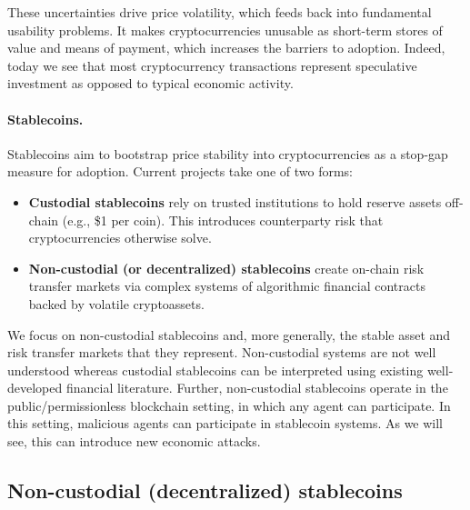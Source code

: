 These uncertainties drive price volatility, which feeds back into fundamental usability problems. It makes cryptocurrencies unusable as short-term stores of value and means of payment, which increases the barriers to adoption. Indeed, today we see that most cryptocurrency transactions represent speculative investment as opposed to typical economic activity.


\paragraph{Stablecoins.}
Stablecoins aim to bootstrap price stability into cryptocurrencies as a stop-gap measure for adoption. Current projects take one of two forms:
\begin{itemize}
	\item \textbf{Custodial stablecoins} rely on trusted institutions to hold reserve assets off-chain (e.g., \$1 per coin). This introduces counterparty risk that cryptocurrencies otherwise solve.
	\item \textbf{Non-custodial (or decentralized) stablecoins} create on-chain risk transfer markets via complex systems of algorithmic financial contracts backed by volatile cryptoassets.
\end{itemize}
We focus on non-custodial stablecoins and, more generally, the stable asset and risk transfer markets that they represent. Non-custodial systems are not well understood whereas custodial stablecoins can be interpreted using existing well-developed financial literature. Further, non-custodial stablecoins operate in the public/permissionless blockchain setting, in which any agent can participate. In this setting, malicious agents can participate in stablecoin systems. As we will see, this can introduce new economic attacks.



\subsection{Non-custodial (decentralized) stablecoins}


